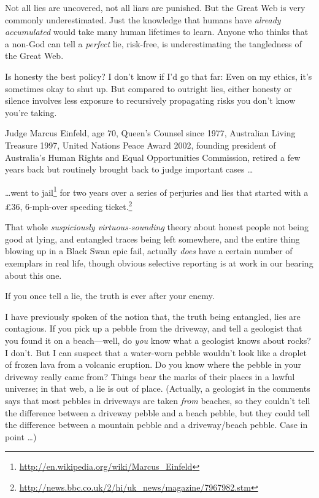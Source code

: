 {
 Not all lies are uncovered, not all liars are punished. But the
Great Web is very commonly underestimated. Just the knowledge that
humans have \textit{already accumulated} would take many human
lifetimes to learn. Anyone who thinks that a non-God can tell a
\textit{perfect} lie, risk-free, is underestimating the tangledness of
the Great Web.}

{
 Is honesty the best policy? I don't know if
I'd go that far: Even on my ethics,
it's sometimes okay to shut up. But compared to
outright lies, either honesty or silence involves less exposure to
recursively propagating risks you don't know
you're taking.}

\myendsectiontext


\bigskip


{
 Judge Marcus Einfeld, age 70, Queen's Counsel
since 1977, Australian Living Treasure 1997, United Nations Peace Award
2002, founding president of Australia's Human Rights
and Equal Opportunities Commission, retired a few years back but
routinely brought back to judge important cases \ldots }

{
 \ldots went to jail\footnote{\url{http://en.wikipedia.org/wiki/Marcus_Einfeld}} for two years over a series of perjuries and
lies that started with a \pounds 36, 6-mph-over speeding ticket.\footnote{\url{http://news.bbc.co.uk/2/hi/uk_news/magazine/7967982.stm}}}

{
 That whole \textit{suspiciously virtuous-sounding} theory about
honest people not being good at lying, and entangled traces being left
somewhere, and the entire thing blowing up in a Black Swan epic fail,
actually \textit{does} have a certain number of exemplars in real life,
though obvious selective reporting is at work in our hearing about this
one.}

\myendsectiontext


{
 If you once tell a lie, the truth is ever after your enemy. }

{
 I have previously spoken of the notion that, the truth being
entangled, lies are contagious. If you pick up a pebble from the
driveway, and tell a geologist that you found it on a beach---well, do
\textit{you} know what a geologist knows about rocks? I
don't. But I can suspect that a water-worn pebble
wouldn't look like a droplet of frozen lava from a
volcanic eruption. Do you know where the pebble in your driveway really
came from? Things bear the marks of their places in a lawful universe;
in that web, a lie is out of place. (Actually, a geologist in the
comments says that most pebbles in driveways are taken \textit{from}
beaches, so they couldn't tell the difference between a
driveway pebble and a beach pebble, but they could tell the difference
between a mountain pebble and a driveway/beach pebble. Case in point
\ldots)}


